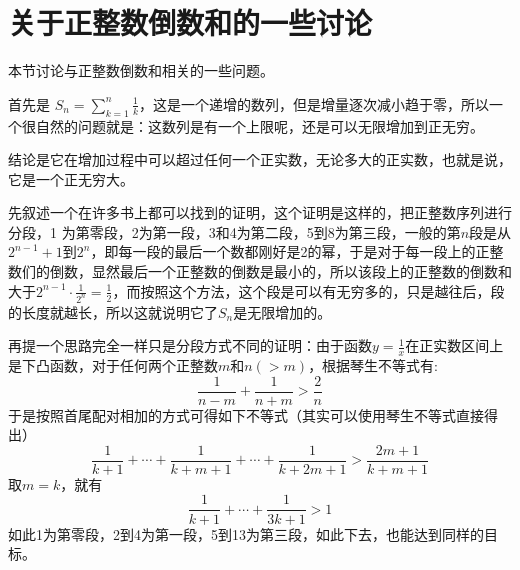 
\section{关于正整数倒数和的一些讨论}
\label{sec:sum-reciprocal-of-positive-integer}

本节讨论与正整数倒数和相关的一些问题。

首先是 $S_n=\sum_{k=1}^n\frac{1}{k}$，这是一个递增的数列，但是增量逐次减小趋于零，所以一个很自然的问题就是：这数列是有一个上限呢，还是可以无限增加到正无穷。

结论是它在增加过程中可以超过任何一个正实数，无论多大的正实数，也就是说，它是一个正无穷大。

先叙述一个在许多书上都可以找到的证明，这个证明是这样的，把正整数序列进行分段，1 为第零段，2为第一段，3和4为第二段，5到8为第三段，一般的第$n$段是从$2^{n-1}+1$到$2^n$，即每一段的最后一个数都刚好是2的幂，于是对于每一段上的正整数们的倒数，显然最后一个正整数的倒数是最小的，所以该段上的正整数的倒数和大于$2^{n-1}\cdot \frac{1}{2^n}=\frac{1}{2}$，而按照这个方法，这个段是可以有无穷多的，只是越往后，段的长度就越长，所以这就说明它了$S_n$是无限增加的。

再提一个思路完全一样只是分段方式不同的证明：由于函数$y=\frac{1}{x}$在正实数区间上是下凸函数，对于任何两个正整数$m$和$n(>m)$，根据琴生不等式有:
\begin{equation*}
  \frac{1}{n-m} + \frac{1}{n+m} > \frac{2}{n}
\end{equation*}
于是按照首尾配对相加的方式可得如下不等式（其实可以使用琴生不等式直接得出）
\begin{equation*}
  \frac{1}{k+1} + \cdots + \frac{1}{k+m+1} + \cdots + \frac{1}{k+2m+1} > \frac{2m+1}{k+m+1}
\end{equation*}
取$m=k$，就有
\begin{equation*}
  \frac{1}{k+1} + \cdots + \frac{1}{3k+1} > 1
\end{equation*}
如此1为第零段，2到4为第一段，5到13为第三段，如此下去，也能达到同样的目标。

